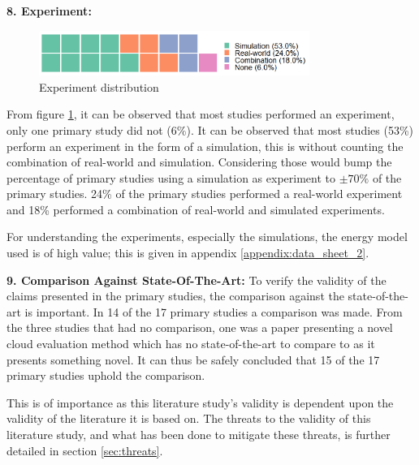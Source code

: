 \vspace{5mm}

\noindent\textbf{8. Experiment:}
\begin{figure}
    \includegraphics[width=250pt]{figures/waffle_exp_freq.png}
    \caption{Experiment distribution}
    \label{fig:experiment_distr}
\end{figure}
From figure \ref{fig:experiment_distr}, it can be observed that most studies performed an experiment, only one primary study did not (6\%).
It can be observed that most studies (53\%) perform an experiment in the form of a simulation, 
this is without counting the combination of real-world and simulation.
Considering those would bump the percentage of primary studies using a simulation as experiment to $\pm 70\%$ of the primary studies.
24\% of the primary studies performed a real-world experiment and 18\% performed a combination of real-world and simulated experiments.

\vspace{2mm}

For understanding the experiments, especially the simulations, the energy model used is of high value; this is given in appendix \ref{appendix:data_sheet_2}.

\vspace{5mm}

\noindent\textbf{9. Comparison Against State-Of-The-Art:}
To verify the validity of the claims presented in the primary studies, the comparison against the state-of-the-art is important.
In 14 of the 17 primary studies a comparison was made.
From the three studies that had no comparison, one was a paper presenting a novel cloud evaluation method \cite{hou2017novel_cloud_evaluation_model}
which has no state-of-the-art to compare to as it presents something novel. 
It can thus be safely concluded that 15 of the 17 primary studies uphold the comparison.

\vspace{2mm}

\noindent This is of importance as this literature study's validity is dependent upon the validity of the literature it is based on.
The threats to the validity of this literature study, and what has been done to mitigate these threats,
is further detailed in section \ref{sec:threats}.

